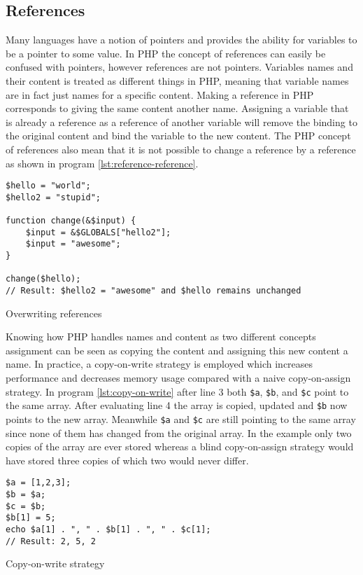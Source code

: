 \subsection{References}
\label{sec:backg_references}
Many languages have a notion of pointers and provides the ability for variables to be a pointer to some value. In PHP the concept of references can easily be confused with pointers, however references are not pointers. Variables names and their content is treated as different things in PHP, meaning that variable names are in fact just names for a specific content. Making a reference in PHP corresponds to giving the same content another name. Assigning a variable that is already a reference as a reference of another variable will remove the binding to the original content and bind the variable to the new content. The PHP concept of references also mean that it is not possible to change a reference by a reference as shown in program \ref{lst:reference-reference}.

\begin{program}
\begin{lstlisting}
$hello = "world";
$hello2 = "stupid";

function change(&$input) {
    $input = &$GLOBALS["hello2"];
    $input = "awesome";
}

change($hello);
// Result: $hello2 = "awesome" and $hello remains unchanged
\end{lstlisting}
\caption{Overwriting references}
\label{lst:reference-reference}
\end{program}

Knowing how PHP handles names and content as two different concepts assignment can be seen as copying the content and assigning this new content a name. In practice, a copy-on-write strategy is employed which increases performance and decreases memory usage compared with a naive copy-on-assign strategy. In program \ref{lst:copy-on-write} after line 3 both \texttt{\$a}, \texttt{\$b}, and \texttt{\$c} point to the same array. After evaluating line 4 the array is copied, updated and \texttt{\$b} now points to the new array. Meanwhile \texttt{\$a} and \texttt{\$c} are still pointing to the same array since none of them has changed from the original array. In the example only two copies of the array are ever stored whereas a blind copy-on-assign strategy would have stored three copies of which two would never differ.

\begin{program}
\begin{lstlisting}
$a = [1,2,3];
$b = $a;
$c = $b;
$b[1] = 5;
echo $a[1] . ", " . $b[1] . ", " . $c[1];
// Result: 2, 5, 2
\end{lstlisting}
\caption{Copy-on-write strategy}
\label{lst:copy-on-write}
\end{program}

